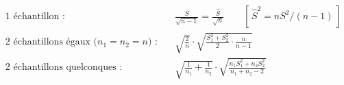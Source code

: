 \documentclass[11pt,a4paper]{article}
\begin{document}
\begin{methbox}
\begin{align*}
\text{1 \'echantillon~:} &\quad \frac{S}{\sqrt{n-1}} = \frac{\hat{S}}{\sqrt{n}}
  \qquad [\,\hat{S}^2 = nS^2/(n-1)\,] \\[6pt]
\text{2 \'echantillons \'egaux ($n_1=n_2=n$)~:} &\quad
  \sqrt{\frac{2}{n}}\cdot\sqrt{\frac{S_1^2+S_2^2}{2}\cdot\frac{n}{n-1}} \\[6pt]
\text{2 \'echantillons quelconques~:} &\quad
  \sqrt{\frac{1}{n_1}+\frac{1}{n_2}}\cdot
  \sqrt{\frac{n_1S_1^2+n_2S_2^2}{n_1+n_2-2}}
\end{align*}
\end{methbox}
\end{document}
